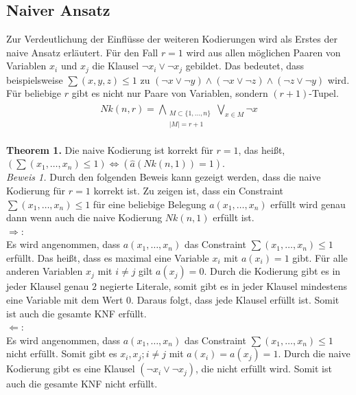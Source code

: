 \documentclass[a4,abstract=on]{scrartcl}
\begin{document}
	\subsection{Naiver Ansatz}
Zur Verdeutlichung der Einflüsse der weiteren Kodierungen wird als Erstes der naive Ansatz erläutert. Für den Fall $r=1$ wird aus allen möglichen Paaren von Variablen $x_i$ und $x_j$ die Klausel $\neg x_i \vee \neg x_j$ gebildet. Das bedeutet, dass beispielsweise $\sum(x,y,z)\leq1$ zu $(\neg x \vee \neg y) \wedge (\neg x \vee \neg z) \wedge (\neg z \vee \neg y)$ wird.
Für beliebige $r$ gibt es nicht nur Paare von Variablen, sondern $(r+1)$-Tupel.\\
\begin{align*}
\begin{aligned}
Nk (n, r) = \bigwedge_{\substack{M\subset \{1, \dots, n\} \\  |M|=r+1}} \bigvee_{x \in M} {\neg x}
\end{aligned}
\end{align*}


\textbf{Theorem 1.} Die naive Kodierung ist korrekt für $r = 1$, das heißt, $(\sum (x_1, \dots, x_n) \leq 1) \Leftrightarrow (\hat{a} (Nk(n,1)) = 1)$.\\
\newline
\textit{Beweis 1.} Durch den folgenden Beweis kann gezeigt werden, dass die naive Kodierung für $r=1$ korrekt ist. Zu zeigen ist, dass ein Constraint $\sum(x_1, \dots,x_n) \leq 1$ für eine beliebige Belegung $a(x_1, \dots ,x_n)$ erfüllt wird genau dann wenn auch die naive Kodierung $Nk(n, 1)$ erfüllt ist.\\
$\Rightarrow$:\\
Es wird angenommen, dass $a(x_1, \dots ,x_n)$ das Constraint $\sum(x_1, \dots,x_n) \leq 1$ erfüllt. Das heißt, dass es maximal eine Variable $x_i$ mit $a(x_i) = 1$ gibt. Für alle anderen Variablen $x_j$ mit $i \neq j$ gilt $a(x_j) = 0$. Durch die Kodierung gibt es in jeder Klausel genau $2$ negierte Literale, somit gibt es in jeder Klausel mindestens eine Variable mit dem Wert $0$. Daraus folgt, dass jede Klausel erfüllt ist. Somit ist auch die gesamte KNF erfüllt.\\
$\Leftarrow$:\\
Es wird angenommen, dass $a(x_1, \dots ,x_n)$ das Constraint $\sum(x_1, \dots,x_n) \leq 1$ nicht erfüllt. Somit gibt es $x_i, x_j; i \neq j$ mit $a(x_i) = a(x_j) = 1$. Durch die naive Kodierung gibt es eine Klausel $(\neg x_i \vee \neg x_j)$, die nicht erfüllt wird. Somit ist auch die gesamte KNF nicht erfüllt.
\end{document}
